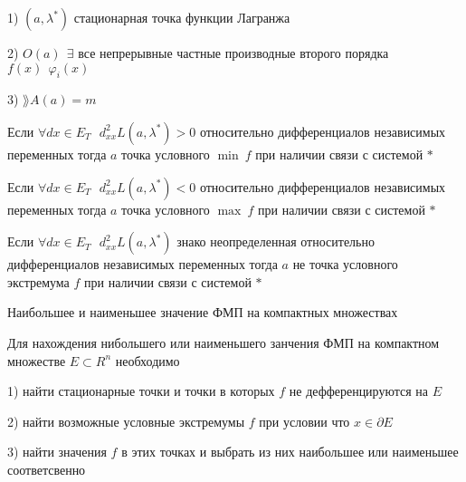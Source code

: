 \begin{block}
  1) $(a, \lambda^*)$ стационарная точка функции Лагранжа

  2) $O(a) ~~ \exists$ все непрерывные частные производные второго порядка
  $f(x) ~~ \varphi_i (x)$

  3) $\rang A(a) = m$

  Если $\forall dx \in E_T ~~~ d_{xx}^2 L(a, \lambda^*) > 0$ относительно
  дифференциалов независимых переменных тогда $a$
  точка условного $\min ~ f$ при наличии связи с системой $*$

  Если $\forall dx \in E_T ~~~ d_{xx}^2 L(a, \lambda^*) < 0$ относительно
  дифференциалов независимых переменных тогда $a$
  точка условного $\max ~ f$ при наличии связи с системой $*$

  Если $\forall dx \in E_T ~~~ d_{xx}^2 L(a, \lambda^*)$ знако
  неопределенная относительно дифференциалов независимых переменных тогда $a$
  не точка условного экстремума $f$ при наличии связи с системой $*$
\end{block}

\begin{title}[\Large]
  Наибольшее и наименьшее значение ФМП на компактных множествах
\end{title}

\begin{block}
  Для нахождения нибольшего или наименьшего занчения ФМП на компактном
  множестве $E \subset R^n$ необходимо

  1) найти стационарные точки и точки в которых $f$ не дефференцируются на $E$

  2) найти возможные условные экстремумы $f$ при условии что $x \in \partial E$

  3) найти значения $f$ в этих точках и выбрать из них наибольшее или наименьшее
  соответсвенно
\end{block}